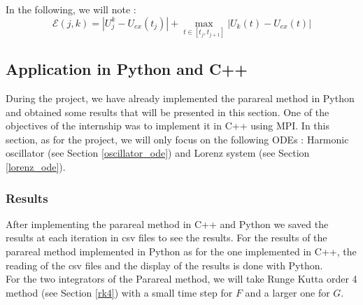 \noindent In the following, we will note : $$\mathcal{E}(j,k)=|U_j^k-U_{ex}(t_j)|+\max_{t\in[t_j,t_{j+1}]}|U_k(t)-U_{ex}(t)|$$



\newpage

\subsection{Application in Python and C++}

During the project, we have already implemented the parareal method in Python and obtained some results that will be presented in this section. One of the objectives of the internship was to implement it in C++ using MPI. In this section, as for the project, we will only focus on the following ODEs : Harmonic oscillator (see Section \ref{oscillator_ode}) and Lorenz system (see Section \ref{lorenz_ode}).

\subsubsection{Results}

After implementing the parareal method in C++ and Python we saved the results at each iteration in csv files to see the results. For the results of the parareal method implemented in Python as for the one implemented in C++, the reading of the csv files and the display of the results is done with Python. \\
For the two integrators of the Parareal method, we will take Runge Kutta order 4 method (see Section \ref{rk4}) with a small time step for $F$ and a larger one for $G$. 

